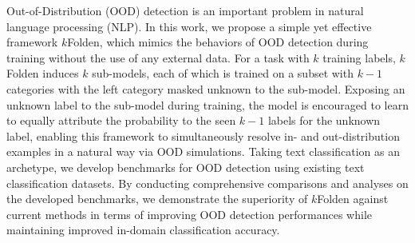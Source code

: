 Out-of-Distribution (OOD) detection is an important problem in natural language processing (NLP). In this work, we propose a simple yet effective framework $k$Folden, which mimics the behaviors of OOD detection during training without the use of any external data. For a task with $k$ training labels, $k$Folden induces $k$ sub-models, each of which is trained on a subset with $k-1$ categories with the left category masked unknown to the sub-model. Exposing an unknown label to the sub-model during training, the model is encouraged to learn to equally attribute the probability  to the seen $k-1$ labels for the unknown label, enabling  this framework to simultaneously resolve in- and out-distribution examples in a natural way via OOD simulations. Taking text classification as an archetype, we develop benchmarks for OOD detection using existing text classification datasets. By conducting comprehensive comparisons and analyses on the developed benchmarks, we demonstrate the superiority of $k$Folden against current methods in terms of improving OOD detection performances while maintaining improved in-domain classification accuracy.
